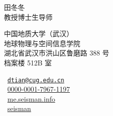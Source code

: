 \documentclass[11pt,a4paper]{article}
\makeatletter
\newcommand{\Name}{田冬冬}
\newcommand{\Role}{教授\hspace{0.5em}博士生导师}
\newcommand{\Email}{dtian@cug.edu.cn}
\newcommand{\Website}{me.seisman.info}
\newcommand{\Github}{seisman}
\newcommand{\Orcid}{0000-0001-7967-1197}
\newcommand{\Affiliation}{中国地质大学（武汉）\\ 地球物理与空间信息学院}
\newcommand{\Address}{湖北省武汉市洪山区鲁磨路 388 号\\ 档案楼 512B 室}
\makeatother
\begin{document}
\thispagestyle{empty} %
\begin{center}
\kaishu
{\fontsize{24pt}{0}\selectfont \Name \hspace{1ex}} \\[0.4cm]
{\fontsize{16pt}{0}\selectfont \Role} \\[0.2cm]
\end{center}
\begin{minipage}[t]{0.7\textwidth}
  \kaishu
  \fontsize{12pt}{15pt}\selectfont
  \Affiliation
  \\
  \Address
\end{minipage}
\begin{minipage}[t]{0.3\textwidth}
  \kaishu
  \fontsize{12pt}{15pt}\selectfont
  \begin{flushleft}
    \faEnvelope\ \href{mailto:\Email}{\texttt{\Email}}
    \\
    \faLink\ \href{https://orcid.org/\Orcid}{\Orcid}
    \\
    \faGlobe\ \href{https://\Website}{\Website}
    \\
    \faGithub\ \href{https://github.com/\Github}{\Github}
  \end{flushleft}
\end{minipage}
\vspace{0.2cm}








%





\end{document}
